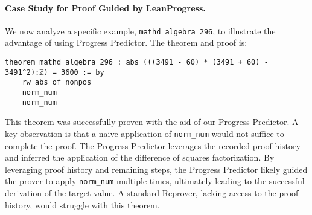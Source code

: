 \paragraph{Case Study for Proof Guided by LeanProgress.}
We now analyze a specific example, \texttt{mathd\_algebra\_296}, to illustrate the advantage of using Progress Predictor.  The theorem and proof is:

\begin{lstlisting}[language=Lean]
theorem mathd_algebra_296 : abs (((3491 - 60) * (3491 + 60) - 3491^2):ℤ) = 3600 := by
    rw abs_of_nonpos
    norm_num
    norm_num
\end{lstlisting}

This theorem was successfully proven with the aid of our Progress Predictor.  A key observation is that a naive application of \texttt{norm\_num} would not suffice to complete the proof. The Progress Predictor leverages the recorded proof history and inferred the application of the difference of squares factorization. By leveraging proof history and remaining steps, the Progress Predictor likely guided the prover to apply \texttt{norm\_num} multiple times, ultimately leading to the successful derivation of the target value.  A standard Reprover, lacking access to the proof history, would struggle with this theorem.
